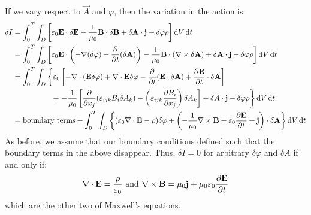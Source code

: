 \documentclass[../main.tex]{subfiles}
\begin{document}
If we vary respect to $\vec{A}$ and $\varphi$, then the variation in the action is:
\begin{align*}
  \delta I &= \int_{0}^{T} \int_{D} \left[\varepsilon_0 \vec{E} \cdot \delta \vec{E} - \frac{1}{\mu_0} \vec{B} \cdot \delta \vec{B} + \delta \vec{A} \cdot \vec{j} - \delta \varphi \rho\right] \d{V} \d{t} \\
           &= \int_{0}^{T} \int_{D} \left[\varepsilon_0 \vec{E} \cdot \left(-\nabla(\delta \varphi) - \pderiv{}{t}(\delta \vec{A})\right) - \frac{1}{\mu_0} \vec{B} \cdot (\nabla \times \delta \vec{A}) + \delta \vec{A} \cdot \vec{j} - \delta \varphi \rho\right] \d{V} \d{t} \\
           &= \int_{0}^{T} \int_{D} \left\{\varepsilon_0 \left[ - \nabla \cdot (\vec{E} \delta \varphi) + \nabla \cdot \vec{E} \delta \varphi - \pderiv{}{t}(\vec{E} \cdot \delta \vec{A}) + \pderiv{\vec{E}}{t} \cdot \delta \vec{A}\right]\right. \\
           &\hspace{1.8cm}+ \left. -\frac{1}{\mu_0}\left[\pderiv{}{x_j} (\levi_{i j k}B_i \delta A_k) - \left(\levi_{i j k} \pderiv{B_i}{x_j}\right)\delta A_k\right] + \delta A \cdot \vec{j} - \delta \varphi \rho\right\}\d{V} \d{t} \\
           &= \text{boundary terms} + \int_{0}^{T} \int_{D} \left\{(\varepsilon_0 \nabla \cdot \vec{E} - \rho)\delta \varphi + \left(-\frac{1}{\mu_0}\nabla \times \vec{B} + \varepsilon_0 \pderiv{\vec{E}}{t} + \vec{j}\right) \cdot \delta \vec{A} \right\} \d{V} \d{t}
\end{align*}
As before, we assume that our boundary conditions defined such that the boundary terms in the above disappear.
Thus, $\delta I = 0$ for arbitrary $\delta \varphi$ and $\delta A$ if and only if:
\[
  \nabla \cdot \vec{E} = \frac{\rho}{\varepsilon_0} \text{ and } \nabla \times \vec{B} = \mu_0 \vec{j} + \mu_0 \varepsilon_0 \pderiv{\vec{E}}{t}
\]
which are the other two of Maxwell's equations.
\end{document}
